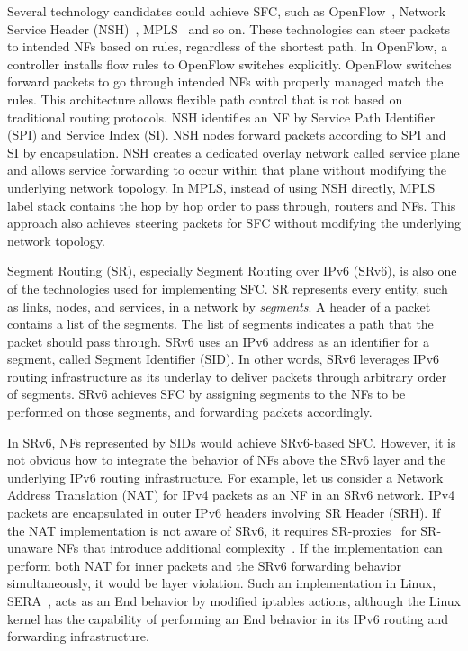 Several technology candidates could achieve SFC, such as OpenFlow~\cite{openflow}, Network Service Header (NSH)~\cite{rfc8300}, \fussy MPLS~\cite{rfc8595} and so on.
These technologies can steer packets to intended NFs based on rules, regardless of the shortest path.
In OpenFlow, a controller installs flow rules to OpenFlow switches explicitly.
OpenFlow switches forward packets to go through intended NFs with properly managed match the rules.
This architecture allows flexible path control that is not based on traditional routing protocols.
NSH identifies an NF by Service Path Identifier (SPI) and Service Index (SI).
NSH nodes forward packets according to SPI and SI by encapsulation.
NSH creates a dedicated overlay network called service plane and allows service forwarding to occur within that plane without modifying the underlying network topology. 
In MPLS, instead of using NSH directly, MPLS label stack contains the hop by hop order to pass through, routers and NFs.
This approach also achieves steering packets for SFC without modifying the underlying network topology. 

Segment Routing (SR), especially Segment Routing over IPv6 (SRv6), is also one of the technologies used for implementing SFC.
SR represents every entity, such as links, nodes, and services, in a network by \textit{segments}.
A header of a packet contains a list of the segments.
The list of segments indicates a path that the packet should pass through.
SRv6 uses an IPv6 address as an identifier for a segment, called Segment Identifier (SID).
In other words, SRv6 leverages IPv6 routing infrastructure as its underlay to deliver packets through arbitrary order of segments.
SRv6 achieves SFC by assigning segments to the NFs to be performed on those segments, and forwarding packets accordingly.

In SRv6, NFs represented by SIDs would achieve SRv6-based SFC.
However, it is not obvious how to integrate the behavior of NFs above the SRv6 layer and the underlying IPv6 routing infrastructure.
For example, let us consider a Network Address Translation (NAT) for IPv4 packets as an NF in an SRv6 network.
IPv4 packets are encapsulated in outer IPv6 headers involving SR Header (SRH). %
If the NAT implementation is not aware of SRv6, it requires SR-proxies~\cite{ietf-spring-sr-service-programming-08} for SR-unaware NFs that introduce additional complexity~\cite{draft-scexp}.
If the implementation can perform both NAT for inner packets and the SRv6 forwarding behavior simultaneously, it would be layer violation.
Such an implementation in Linux, SERA~\cite{sera}, acts as an End behavior by modified iptables actions, although the Linux kernel has the capability of performing an End behavior in its IPv6 routing and forwarding infrastructure.


